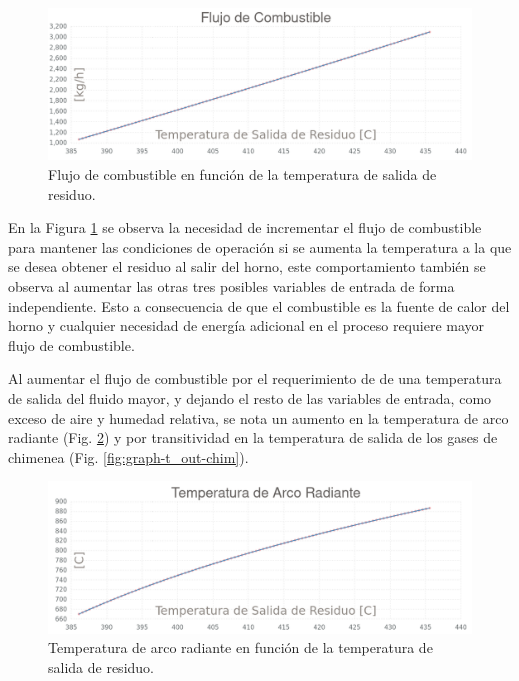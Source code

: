 \begin{figure}[hbt]
\begin{center}
\includegraphics[scale=0.38]{images/graph-t_out-fuel}
\caption[Flujo de combustible vs Temperatura de salida de residuo]{Flujo de combustible en función de la temperatura de salida de residuo.}
\label{fig:graph-t_out-fuel}
\end{center}
\end{figure}

\par En la Figura \ref{fig:graph-t_out-fuel} se observa la necesidad de incrementar el flujo de combustible para mantener las condiciones de operación si se aumenta la temperatura a la que se desea obtener el residuo al salir del horno, este comportamiento también se observa al aumentar las otras tres posibles variables de entrada de forma independiente. Esto a consecuencia de que el combustible es la fuente de calor del horno y cualquier necesidad de energía adicional en el proceso requiere mayor flujo de combustible.

\par Al aumentar el flujo de combustible por el requerimiento de de una temperatura de salida del fluido mayor, y dejando el resto de las variables de entrada, como exceso de aire y humedad relativa, se nota un aumento en la temperatura de arco radiante (Fig. \ref{fig:graph-t_out-arc}) y por transitividad en la temperatura de salida de los gases de chimenea (Fig. \ref{fig:graph-t_out-chim}).

\begin{figure}[hbt]
\begin{center}
\includegraphics[scale=0.38]{images/graph-t_out-arc}
\caption[Temperatura de arco radiante vs Temperatura de salida de residuo]{Temperatura de arco radiante en función de la temperatura de salida de residuo.}
\label{fig:graph-t_out-arc}
\end{center}
\end{figure}

